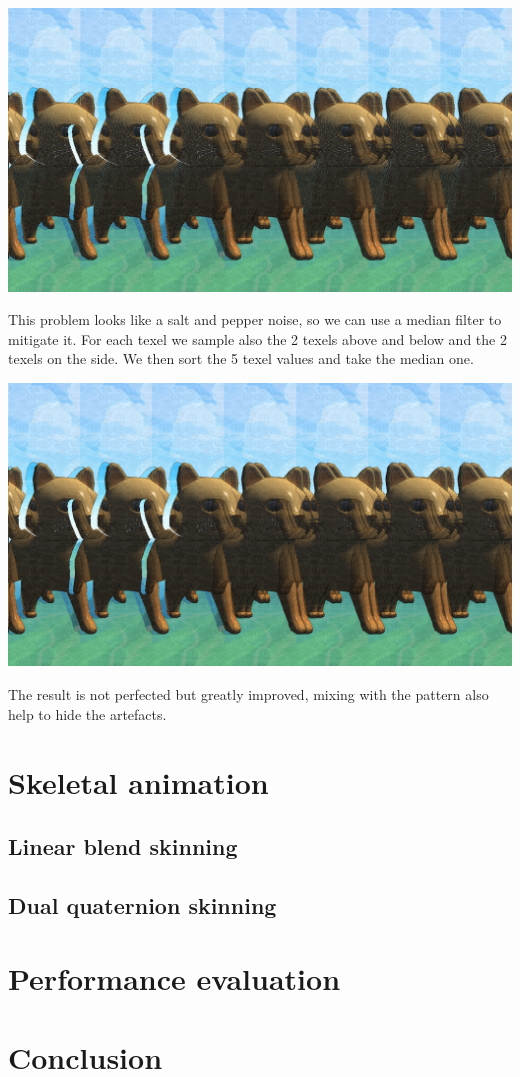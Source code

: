 \documentclass[12pt, a4paper]{article}
\begin{document}
\begin{center}
    \centering
    \includegraphics[width=1.0\textwidth]{img/error.png}
\end{center}

This problem looks like a salt and pepper noise, so we can use a median filter to mitigate it. For each texel
we sample also the 2 texels above and below and the 2 texels on the side. We then sort the 5 texel values and take
the median one.

\begin{center}
    \centering
    \includegraphics[width=1.0\textwidth]{img/fix.png}
\end{center}
The result is not perfected but greatly improved, mixing with the pattern also help to hide the artefacts.

\section{Skeletal animation}

\subsection{Linear blend skinning}

\subsection{Dual quaternion skinning}

\section{Performance evaluation}

\section{Conclusion}
\end{document}
